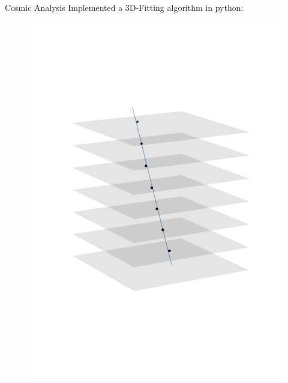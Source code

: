 \documentclass{beamer}
\begin{document}
\begin{frame}[fragile]{Cosmic Analysis}
    Implemented a 3D-Fitting algorithm in python:\\
    \begin{minipage}{.32\textwidth}
	\begin{figure}[H]
	    \centering
	    \includegraphics[trim=0 80 0 80,clip,width=\textwidth]{example_1459.png}
	\end{figure}
    \end{minipage}
    \begin{minipage}{.32\textwidth}
	\begin{figure}[H]
	    \centering

\end{figure}
\end{minipage}
\end{frame}
\end{document}
